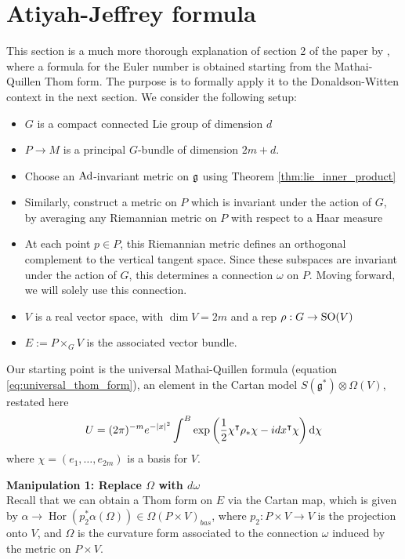 \section{Atiyah-Jeffrey formula}
This section is a much more thorough explanation of section 2 of the paper by
\citet{atiyahlagrangians}, where a formula for the Euler number is obtained
starting from the Mathai-Quillen Thom form. 
The purpose is to formally apply it to the Donaldson-Witten context in the next
section. We consider the following setup: 
\begin{itemize}
	\item $G$ is a compact connected Lie group of dimension $d$
	\item $P\to M$ is a principal $G$-bundle  of dimension  $2m+d$.
	\item Choose an $\operatorname{Ad}$-invariant metric on $\operatorname{\mathfrak{g}}$ using Theorem 
		\ref{thm:lie_inner_product}
	\item Similarly, construct a metric on $P$ which is invariant under the 
		action of  $G$, by averaging any Riemannian metric on $P$ with respect 
		to a Haar measure  
	\item At each point $p\in P$, this Riemannian metric defines an orthogonal
complement to the vertical tangent space. Since these subspaces are invariant
under the action of $G$, this determines a connection  $\omega$ on  $P$.
Moving forward, we will solely use this connection.
	\item $V$ is a real vector space, with $\dim V = 2m$ and a
rep $\rho : G \to \operatorname{SO}(V)$
	\item $E:= P\times_G V$ is the associated vector bundle.
\end{itemize}

Our starting point is the universal Mathai-Quillen formula
(equation \ref{eq:universal_thom_form}), an element in the
Cartan model $S(\mathfrak{g}^*)\otimes \Omega(V)$, restated here
\begin{equation} \label{eq:universal_thom_form2}
	U = (2\pi)^{-m}e^{-\abs{x}^2}\int^B
	\exp\paren{\frac{1}{2}\chi^{\intercal}\rho_*\chi - idx^\intercal \chi}
	\odif{\chi}
\end{equation}
where $\chi = (e_1,\ldots,e_{2m})$ is a basis for $V$.

\vspace{1ex}\noindent
\textbf{Manipulation 1: Replace $\Omega$ with  $d\omega$} \\
Recall that we can obtain a Thom form on $E$ via the Cartan map, which is given
by $\alpha\to \operatorname{Hor}(p_2^*\alpha(\Omega)) \in \Omega(P\times V)_{bas}$, 
where $p_2:P\times V\to V$ is the projection onto $V$, and $\Omega$ is the
curvature form associated to the connection $\omega$ induced by the
metric on $P\times V$.

